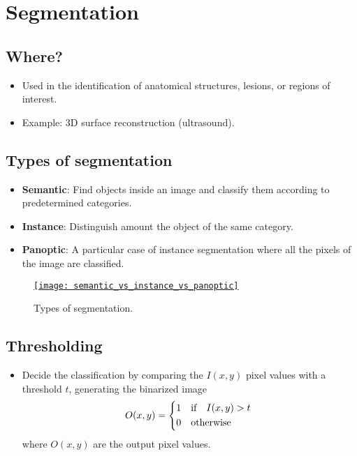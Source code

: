 \chapter{Segmentation}

\section{Where?}
\begin{itemize}
\item Used in the identification of anatomical structures, lesions, or regions of interest.
\item Example: 3D surface reconstruction (ultrasound).
\end{itemize}
  
\section{Types of segmentation}

\begin{itemize}
\item \textbf{Semantic}: Find objects inside an image and classify them according to predetermined categories.
\item \textbf{Instance}: Distinguish amount the object of the same category.
\item \textbf{Panoptic}: A particular case of instance segmentation where all the pixels of the image are classified.
\end{itemize}

\begin{figure}[H]
  \vspace{-0ex}
  \centering
  \href{https://www.labellerr.com/blog/semantic-vs-instance-vs-panoptic-which-image-segmentation-technique-to-choose/}{\texttt{[image: semantic\_vs\_instance\_vs\_panoptic]}}
  \caption{Types of segmentation.}
  \label{fig:types_segmentation}
\end{figure}

\section{Thresholding \cite{gonzalez2009digital}}
\begin{itemize}
\item Decide the classification by comparing the $I(x,y)$ pixel values with a threshold $t$, generating the binarized image
  \begin{equation}
    O(x,y) = \begin{cases*}
      1 & {\text if}\quad $I(x,y)>t$ \\
      0 & {\text otherwise}
    \end{cases*} 
  \end{equation}
  where $O(x,y)$ are the output pixel values.
\end{itemize}

